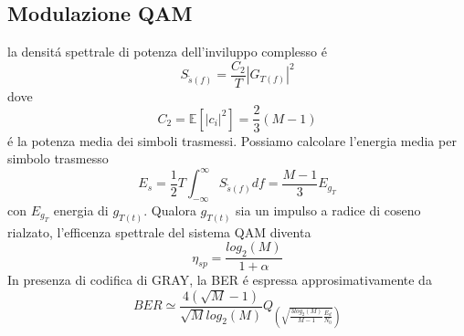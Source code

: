     \subsection{Modulazione QAM}
        la densitá spettrale di potenza dell'inviluppo complesso é 
        \[
            S_{\tilde{s}(f)} = \frac{C_2}{T}\left|G_{T(f)}\right|^2    
        \]
        dove 
        \[
            C_2 = \mathbb{E}[\left|c_i\right|^2] = \frac{2}{3}(M-1)    
        \]
        é la potenza media dei simboli trasmessi. Possiamo calcolare l'energia media per simbolo trasmesso
        \[
            E_s = \frac{1}{2}T\int_{-\infty}^{\infty}S_{\tilde{s}(f)} df = \frac{M-1}{3}E_{g_T}
        \]
        con $E_{g_T}$ energia di $g_{T(t)}$. Qualora $g_{T(t)}$ sia un impulso a radice di coseno rialzato, l'efficenza spettrale del 
        sistema QAM diventa 
        \[
            \eta_{sp} = \frac{log_2(M)}{1+\alpha}  
        \]
        In presenza di codifica di GRAY, la BER é espressa approsimativamente da 
        \[
            BER \simeq \frac{4(\sqrt{M}-1)}{\sqrt{M}log_2(M)}Q_{\displaystyle \left(\sqrt{\frac{3log_2(M)}{M-1}\frac{E_d}{N_0}}\right)}  
        \]
